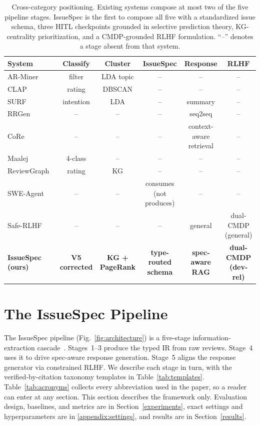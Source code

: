 \documentclass[preprint,12pt]{elsarticle}
\begin{document}
\begin{table}[!htbp]
  \centering
  \footnotesize
  \setlength{\tabcolsep}{4pt}
  \caption{Cross-category positioning. Existing systems compose at most two of the five pipeline
   stages. IssueSpec is the first to compose all five with a standardized issue schema, three
  HITL checkpoints grounded in selective prediction theory, KG-centrality prioritization, and a
  CMDP-grounded RLHF formulation. ``--'' denotes a stage absent from that system.}
  \label{tab:cross-category}
  \setlength{\tabcolsep}{3pt}\scriptsize
  \begin{tabularx}{\textwidth}{@{}L ccccc@{}}
  \toprule
  System & Classify & Cluster & IssueSpec & Response & RLHF \\
  \midrule
  AR-Miner~\cite{chen2014ar} & filter & LDA topic & -- & -- & -- \\
  CLAP~\cite{villarroel2016release} & rating & DBSCAN & -- & -- & -- \\
  SURF~\cite{di2017surf} & intention & LDA & -- & summary & -- \\
  RRGen~\cite{gao2019automating} & -- & -- & -- & seq2seq & -- \\
  CoRe~\cite{gao2021automating} & -- & -- & -- & context-aware retrieval & -- \\
  Maalej~\cite{maalej2015bug} & 4-class & -- & -- & -- & -- \\
  ReviewGraph~\cite{de2025reviewgraph} & rating & KG & -- & -- & -- \\
  SWE-Agent~\cite{yang2024swe} & -- & -- & consumes (not produces) & -- & -- \\
  Safe-RLHF~\cite{dai2024safe} & -- & -- & -- & general & dual-CMDP (general) \\
  \textbf{IssueSpec (ours)} & \textbf{V5 corrected} & \textbf{KG + PageRank} &
  \textbf{type-routed schema} & \textbf{spec-aware RAG} & \textbf{dual-CMDP (dev-rel)} \\
  \bottomrule
  \end{tabularx}
  \end{table}

\section{The IssueSpec Pipeline}\label{system-design}

The IssueSpec pipeline (Fig.~\ref{fig:architecture}) is a five-stage information-extraction cascade~\cite{hearst1999untangling, sarawagi2008information}. Stages~1--3 produce the typed IR from raw reviews. Stage~4 uses it to drive spec-aware response generation. Stage~5 aligns the response generator via constrained RLHF. We describe each stage in turn, with the verified-by-citation taxonomy templates in Table~\ref{tab:templates}. Table~\ref{tab:acronyms} collects every abbreviation used in the paper, so a reader can enter at any section. This section describes the framework only. Evaluation design, baselines, and metrics are in Section~\ref{experiments}, exact settings and hyperparameters are in \ref{appendix:settings}, and results are in Section~\ref{results}.
\end{document}
